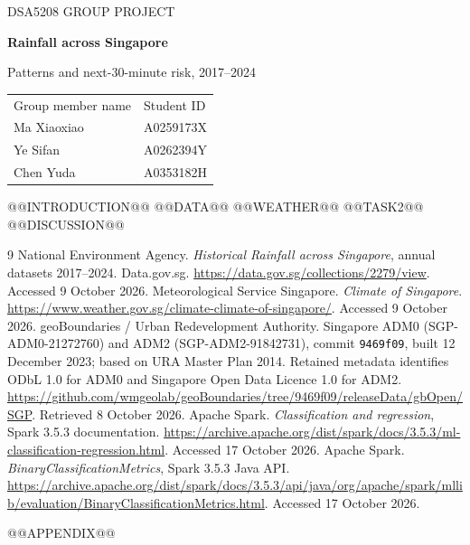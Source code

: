 \documentclass[11pt,a4paper]{article}
\begin{document}
\thispagestyle{empty}
{\small\sffamily\color{teal}DSA5208 GROUP PROJECT}\par
\vspace{3mm}
{\LARGE\sffamily\bfseries\color{ink}Rainfall across Singapore}\par
\vspace{1mm}
{\large\sffamily Patterns and next-30-minute risk, 2017--2024}\par
\vspace{4mm}
\begin{tabularx}{\linewidth}{@{}>{\raggedright\arraybackslash}X>{\raggedright\arraybackslash}X@{}}
\small Group member name & \small Student ID\\[5pt]
Ma Xiaoxiao & A0259173X\\[5pt]
Ye Sifan & A0262394Y\\[5pt]
Chen Yuda & A0353182H\\
\end{tabularx}
\vspace{2mm}
@@INTRODUCTION@@
@@DATA@@
\FloatBarrier
@@WEATHER@@
\FloatBarrier
@@TASK2@@
\FloatBarrier
@@DISCUSSION@@
\begingroup\small\raggedright
\begin{thebibliography}{9}
 National Environment Agency. \emph{Historical Rainfall across Singapore}, annual datasets 2017--2024. Data.gov.sg. \url{https://data.gov.sg/collections/2279/view}. Accessed 9 October 2026.
 Meteorological Service Singapore. \emph{Climate of Singapore}. \url{https://www.weather.gov.sg/climate-climate-of-singapore/}. Accessed 9 October 2026.
 geoBoundaries / Urban Redevelopment Authority. Singapore ADM0 (SGP-ADM0-21272760) and ADM2 (SGP-ADM2-91842731), commit \texttt{9469f09}, built 12 December 2023; based on URA Master Plan 2014. Retained metadata identifies ODbL 1.0 for ADM0 and Singapore Open Data Licence 1.0 for ADM2. \url{https://github.com/wmgeolab/geoBoundaries/tree/9469f09/releaseData/gbOpen/SGP}. Retrieved 8 October 2026.
 Apache Spark. \emph{Classification and regression}, Spark 3.5.3 documentation. \url{https://archive.apache.org/dist/spark/docs/3.5.3/ml-classification-regression.html}. Accessed 17 October 2026.
 Apache Spark. \emph{BinaryClassificationMetrics}, Spark 3.5.3 Java API. \url{https://archive.apache.org/dist/spark/docs/3.5.3/api/java/org/apache/spark/mllib/evaluation/BinaryClassificationMetrics.html}. Accessed 17 October 2026.
\end{thebibliography}
\endgroup
@@APPENDIX@@
\end{document}
